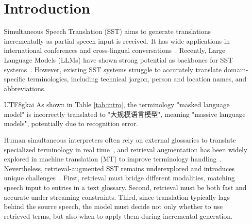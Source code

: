 \section{Introduction}

Simultaneous Speech Translation (SST) aims to generate translations incrementally as partial speech input is received. 
It has wide applications in international conferences and cross-lingual conversations~\citep{ma-etal-2020-simulmt, ren-etal-2020-simulspeech}. 
Recently, Large Language Models (LLMs) have shown strong potential as backbones for SST systems~\citep{wang-etal-2025-conversational, ouyang-etal-2025-infinisst, fu2025efficientadaptivesimultaneousspeech, cheng2025seedliveinterpret20endtoend}. 
However, existing SST systems struggle to accurately translate domain-specific terminologies, including technical jargon, person and location names, and abbreviations.
\begin{CJK*}{UTF8}{gkai}
As shown in Table \ref{tab:intro}, the terminology "masked language model" is incorrectly translated to "大规模语言模型", meaning "massive language models", potentially due to recognition error. 
\end{CJK*} %

Human simultaneous interpreters often rely on external glossaries to translate specialized terminology in real time~\citep{jbp:/content/journals/10.1075/intp.15.1.04jia}, and retrieval augmentation has been widely explored in machine translation (MT) to improve terminology handling~\citep{khandelwal2021nearest,jiang-etal-2021-learning,meng-etal-2022-fast,zhu-etal-2023-ink,li-etal-2025-leveraging}. Nevertheless, retrieval-augmented SST remains underexplored and introduces unique challenges~\citep{cheng2024achievinghumanparityendtoend}. First, retrieval must bridge different modalities, matching speech input to entries in a text glossary. Second, retrieval must be both fast and accurate under streaming constraints. Third, since translation typically lags behind the source speech, the model must decide not only whether to use retrieved terms, but also when to apply them during incremental generation.


